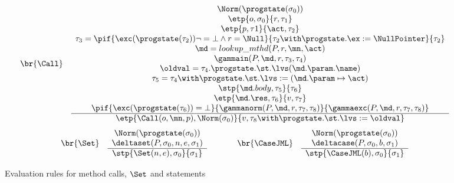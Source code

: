 \begin{figure}[t]
\[
\begin{array}{c}
\begin{array}{lc}
\br{\Call}     &
\begin{array}{c}
\Norm(\progstate(\sigma_0))\\
\etp{o, \sigma_0}{r,\tau_1}\\
\etp{p, \tau1}{\act, \tau_2}\\
\tau_3 =  \pif{\exc(\progstate(\tau_2)) \neg= \bot \wedge r = \Null}
              {\tau_2 \with \progstate.\ex := \NullPointer}{\tau_2}\\
\md = lookup\_mthd(P, r, \mn, \act)\\
\gammain(P, \md, r, \tau_3, \tau_4) \\
\oldval = \tau_4.\progstate.\st.\lvs (\md.\param.\name)\\
\tau_5 = \tau_4 \with \progstate.\st.\lvs := (\md.\param \mapsto \act) \\
\stp{\md.body, \tau_5}{\tau_6}\\
\etp{\md.\res, \tau_6}{v,\tau_7}\\
\pif{\exc(\progstate(\tau_6)) = \bot}{\gammanorm(P, \md, r, \tau_7,
\tau_8)}{\gammaexc(P, \md, r, \tau_7, \tau_8)}\\
\hline
\etp{\Call(o,\mn,p), \Norm(\sigma_0)}{v, \tau_8 \with
\progstate.\st.\lvs := \oldval}
\end{array}
\end{array}
\medskip\\
\begin{array}{ccc}
\begin{array}{lc}
\br{\Set}     &
\begin{array}{c}
\Norm(\progstate(\sigma_0))\\
\deltaset(P, \sigma_0, n, e, \sigma_1)\\
\hline
\stp{\Set(n, e), \sigma_0}{\sigma_1}
\end{array}
\end{array}
&\ \ &
\begin{array}{lc}
\br{\CaseJML}     &
\begin{array}{c}
\Norm(\progstate(\sigma_0))\\
\deltacase(P, \sigma_0, b, \sigma_1)\\
\hline
\stp{\CaseJML(b), \sigma_0}{\sigma_1}
\end{array}
\end{array}
\end{array}

\end{array}
\]
\caption{Evaluation rules for method calls, \(\Set\) and \CaseJML statements}\label{FigEvalRules}
\end{figure}

